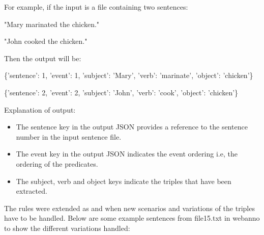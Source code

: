 \documentclass[11pt,letterpaper]{article}
\begin{document}
\noindent
For example, if the input is a file containing two sentences:

"Mary marinated the chicken." 

"John cooked the chicken."

\noindent \newline
Then the output will be:

\{'sentence': 1, 'event': 1, 'subject': 'Mary', 'verb': 'marinate', 'object': 'chicken'\}

\{'sentence': 2, 'event': 2, 'subject': 'John', 'verb': 'cook', 'object': 'chicken'\}

\noindent \newline
Explanation of output:
\begin{itemize}
    \item The sentence key in the output JSON provides a reference to the sentence number in the input sentence file.
    
    \item The event key in the output JSON indicates the event ordering i.e, the ordering of the predicates.
    
    \item The subject, verb and object keys indicate the triples that have been extracted.
\end{itemize}
The rules were extended as and when new scenarios and variations of the triples have to be handled.
Below are some example sentences from file15.txt in webanno to show the different variations handled:
\end{document}
